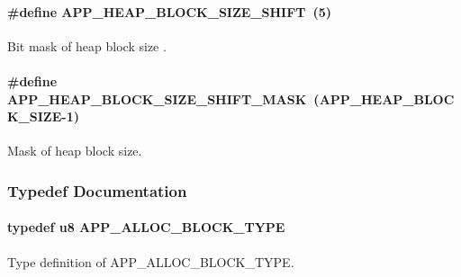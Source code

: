 \paragraph[{\texorpdfstring{A\+P\+P\+\_\+\+H\+E\+A\+P\+\_\+\+B\+L\+O\+C\+K\+\_\+\+S\+I\+Z\+E\+\_\+\+S\+H\+I\+FT}{APP_HEAP_BLOCK_SIZE_SHIFT}}]{\setlength{\rightskip}{0pt plus 5cm}\#define A\+P\+P\+\_\+\+H\+E\+A\+P\+\_\+\+B\+L\+O\+C\+K\+\_\+\+S\+I\+Z\+E\+\_\+\+S\+H\+I\+FT~(5)}\hypertarget{group___h_e_a_p_gab97877e7b2af2f27dcec19233cd2d7d3}{}\label{group___h_e_a_p_gab97877e7b2af2f27dcec19233cd2d7d3}
Bit mask of heap block size . 
\paragraph[{\texorpdfstring{A\+P\+P\+\_\+\+H\+E\+A\+P\+\_\+\+B\+L\+O\+C\+K\+\_\+\+S\+I\+Z\+E\+\_\+\+S\+H\+I\+F\+T\+\_\+\+M\+A\+SK}{APP_HEAP_BLOCK_SIZE_SHIFT_MASK}}]{\setlength{\rightskip}{0pt plus 5cm}\#define A\+P\+P\+\_\+\+H\+E\+A\+P\+\_\+\+B\+L\+O\+C\+K\+\_\+\+S\+I\+Z\+E\+\_\+\+S\+H\+I\+F\+T\+\_\+\+M\+A\+SK~({\bf A\+P\+P\+\_\+\+H\+E\+A\+P\+\_\+\+B\+L\+O\+C\+K\+\_\+\+S\+I\+ZE}-\/1)}\hypertarget{group___h_e_a_p_ga050b0012d8038c0c9b5b8cfe5af842b4}{}\label{group___h_e_a_p_ga050b0012d8038c0c9b5b8cfe5af842b4}
Mask of heap block size. 

\subsubsection{Typedef Documentation}
\paragraph[{\texorpdfstring{A\+P\+P\+\_\+\+A\+L\+L\+O\+C\+\_\+\+B\+L\+O\+C\+K\+\_\+\+T\+Y\+PE}{APP_ALLOC_BLOCK_TYPE}}]{\setlength{\rightskip}{0pt plus 5cm}typedef u8 {\bf A\+P\+P\+\_\+\+A\+L\+L\+O\+C\+\_\+\+B\+L\+O\+C\+K\+\_\+\+T\+Y\+PE}}\hypertarget{group___h_e_a_p_ga2b37dbe3b78e682f59bb6d1aeb58f508}{}\label{group___h_e_a_p_ga2b37dbe3b78e682f59bb6d1aeb58f508}
Type definition of A\+P\+P\+\_\+\+A\+L\+L\+O\+C\+\_\+\+B\+L\+O\+C\+K\+\_\+\+T\+Y\+PE. 
